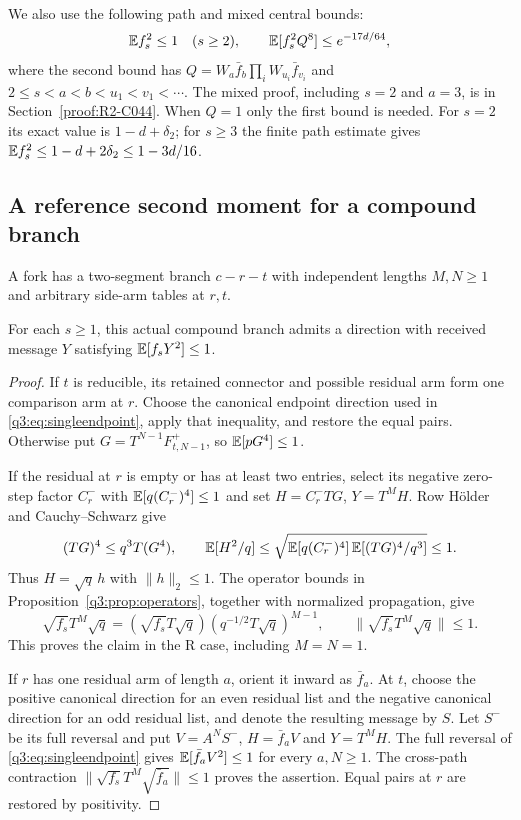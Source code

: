 We also use the following path and mixed central bounds:
\begin{equation}\label{eq:five-mixed}
 \mathbb E f_s^2\le1\quad(s\ge2),\qquad
 \mathbb E[f_s^2Q^8]\le e^{-17d/64},
\end{equation}
where the second bound has
$Q=W_a\bar f_b\prod_iW_{u_i}\bar f_{v_i}$ and
$2\le s<a<b<u_1<v_1<\cdots$. The mixed proof, including $s=2$ and $a=3$,
is in Section~\ref{proof:R2-C044}. When $Q=1$ only the first bound is
needed. For $s=2$ its exact value is $1-d+\delta_2$; for $s\ge3$ the
finite path estimate gives $\mathbb E f_s^2\le1-d+2\delta_2\le1-3d/16$.

\subsection{A reference second moment for a compound branch}
A fork has a two-segment branch $c-r-t$ with independent lengths
$M,N\ge1$ and arbitrary side-arm tables at $r,t$.
\begin{proposition}\label{prop:five-compound}
For each $s\ge1$, this actual compound branch admits a direction with
received message $Y$ satisfying $\mathbb E[f_sY^2]\le1$.
\end{proposition}
\begin{proof}
If $t$ is reducible, its retained connector and possible residual arm
form one comparison arm at $r$. Choose the canonical endpoint direction
used in \eqref{q3:eq:singleendpoint}, apply that inequality, and restore
the equal pairs. Otherwise put
$G=T^{N-1}F^+_{t,N-1}$, so $\mathbb E[pG^4]\le1$.

If the residual at $r$ is empty or has at least two entries, select its
negative zero-step factor $C_r^-$ with $\mathbb E[q(C_r^-)^4]\le1$ and set
$H=C_r^-TG$, $Y=T^MH$. Row H\"older and Cauchy--Schwarz give
\begin{equation}\label{eq:inverse-half}
 (TG)^4\le q^3T(G^4),\qquad
 \mathbb E[H^2/q]\le\sqrt{\mathbb E[q(C_r^-)^4]\,
                         \mathbb E[(TG)^4/q^3]}\le1.
\end{equation}
Thus $H=\sqrt q\,h$ with $\|h\|_2\le1$. The operator bounds in
Proposition~\ref{q3:prop:operators}, together with normalized
propagation, give
\begin{equation}\label{eq:five-normalized}
 \sqrt{f_s}T^M\sqrt q
  =(\sqrt{f_s}T\sqrt q)(q^{-1/2}T\sqrt q)^{M-1},
 \qquad\|\sqrt{f_s}T^M\sqrt q\|\le1.
\end{equation}
This proves the claim in the R case, including $M=N=1$.

If $r$ has one residual arm of length $a$, orient it inward as
$\bar f_a$. At $t$, choose the positive canonical direction for an
even residual list and the negative canonical direction for an odd
residual list, and denote the resulting message by $S$. Let $S^-$
be its full reversal and put $V=A^NS^-$, $H=\bar f_aV$ and $Y=T^MH$.
The full reversal of \eqref{q3:eq:singleendpoint} gives
$\mathbb E[\bar f_aV^2]\le1$ for every $a,N\ge1$.
The cross-path contraction
$\|\sqrt{f_s}T^M\sqrt{\bar f_a}\|\le1$ proves the assertion.
Equal pairs at $r$ are restored by positivity.
\end{proof}

